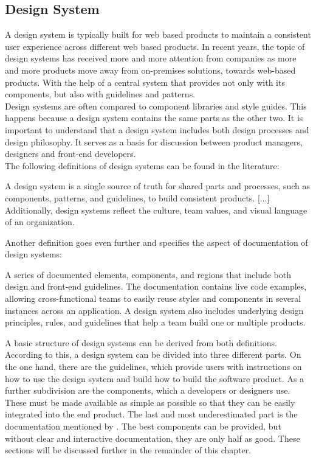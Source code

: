 \subsection{Design System}
A design system is typically built for web based products to maintain a consistent user experience across different web based products. In recent years, the topic of design systems has received more and more attention from companies as more and more products move away from on-premises solutions, towards web-based products.  With the help of a central system that provides not only with its components, but also with guidelines and patterns.  \citep{macdonald_practical_2019} \\
Design systems are often compared to component libraries and style guides. This happens because a design system contains the same parts as the other two. It is important to understand that a design system includes both design processes and design philosophy.  It serves as a basis for discussion between product managers, designers and front-end developers.   \cite{vesselov_building_2019} \\
The following definitions of design systems can be found in the literature:
\begin{tcolorbox}[title=Definition of design system by \citet*{macdonald_practical_2019}]
A design system is a single source of truth for shared parts and processes, such as components, patterns, and guidelines, to build consistent products. [...] Additionally, design systems reflect the culture, team values, and visual language of an organization.
\end{tcolorbox}
Another definition goes even further and specifies the aspect of documentation of design systems:
\begin{tcolorbox}[title=Definition of design system by \citet*{vesselov_building_2019}]
A series of documented elements, components, and regions that include both design and front-end guidelines. The documentation contains live code examples, allowing cross-functional teams to easily reuse styles and components in several instances across an application. A design system also includes underlying design principles, rules, and guidelines that help a team build one or multiple products.
\end{tcolorbox}
A basic structure of design systems can be derived from both definitions. According to this, a design system can be divided into three different parts. On the one hand, there are the guidelines, which provide users with instructions on how to use the design system and build how to build the software product. As a further subdivision are the components, which a developers or designers use. These must be made available as simple as possible so that they can be easily integrated into the end product. The last and most underestimated part is the documentation mentioned by \citet*{vesselov_building_2019}. The best components can be provided, but without clear and interactive documentation, they are only half as good.  These sections will be discussed further in the remainder of this chapter. \cite{macdonald_practical_2019}\cite{vesselov_building_2019}

